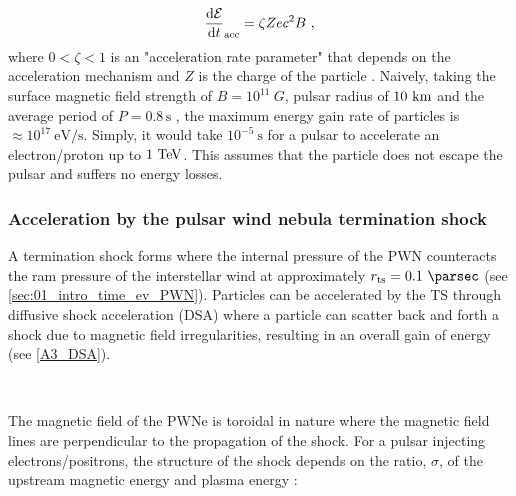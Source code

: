 \begin{equation}
    \begin{aligned}
    \dv{\mathcal{E}}{t}_\text{acc}=\zeta Zec^2B\text{ ,}
    \end{aligned}
\end{equation}
where $0<\zeta<1$ is an "acceleration rate parameter" that depends on the acceleration mechanism and $Z$ is the charge of the particle \citep{2022arXiv221116020T}. Naively, taking the surface magnetic field strength of $B=10^{11}~\si{G}$, pulsar radius of $10~\si{\kilo\meter}$ and the average period of $P=0.8\,\si{\second}$ \citep{2005AJ....129.1993M}, the maximum energy gain rate of particles is $\approx 10^{17}~\si{\electronvolt\per\second}$. Simply, it would take $10^{-5}~\si{\second}$ for a pulsar to accelerate an electron/proton up to $1~\TeV$. This assumes that the particle does not escape the pulsar and suffers no energy losses.

\subsubsection{Acceleration by the pulsar wind nebula termination shock}

A termination shock forms where the internal pressure of the PWN counteracts the ram pressure of the interstellar wind at approximately $r_\text{ts}=0.1~\pc$ (see \autoref{sec:01_intro_time_ev_PWN}). Particles can be accelerated by the TS through diffusive shock acceleration (DSA) where a particle can scatter back and forth a shock due to magnetic field irregularities, resulting in an overall gain of energy (see \autoref{A3_DSA}).
\par~\par
The magnetic field of the PWNe is toroidal in nature where the magnetic field lines are perpendicular to the propagation of the shock. For a pulsar injecting electrons/positrons, the structure of the shock depends on the ratio, $\sigma$, of the upstream magnetic energy and plasma energy \citep{1992ApJ...391...73G}:

